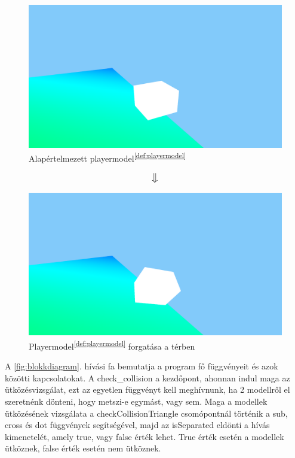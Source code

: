 \begin{figure}[h]
	\centering
	\includegraphics[width=13truecm, height=7truecm]{images/modell_4.3.2.1.png}
	\caption{Alapértelmezett playermodel\textsuperscript{\ref{def:playermodel}}}
	\label{fig:forgatas_1}
\end{figure}
$$\big\Downarrow$$
\begin{figure}[h]
	\centering
	\includegraphics[width=13truecm, height=7truecm]{images/modell_4.3.2.3.png}
	\caption{Playermodel\textsuperscript{\ref{def:playermodel}} forgatása a térben}
	\label{fig:forgatas_2}
\end{figure}

\newpage
{}

A \ref{fig:blokkdiagram}. hívási fa bemutatja a program fő függvényeit és azok közötti kapcsolatokat. A check\_collision a kezdőpont, ahonnan indul maga az ütközésvizsgálat, ezt az egyetlen függvényt kell meghívnunk, ha 2 modellről el szeretnénk dönteni, hogy metszi-e egymást, vagy sem. Maga a modellek ütközésének vizsgálata a checkCollisionTriangle csomópontnál történik a sub, cross és dot függvények segítségével, majd az isSeparated eldönti a hívás kimenetelét, amely true, vagy false érték lehet. True érték esetén a modellek ütköznek, false érték esetén nem ütköznek.

